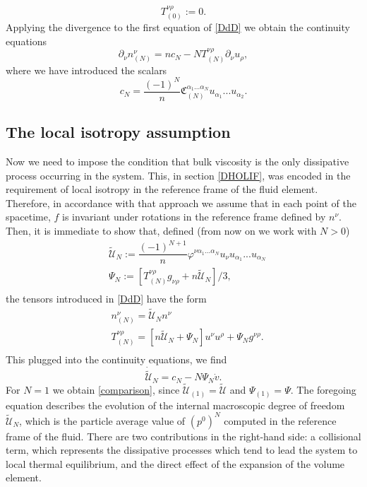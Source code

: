 \documentclass[useAMS,usenatbib,prd,twocolumn,nofootinbib]{revtex4-1}
\begin{document}
\begin{equation}
T_{(0)}^{\nu \rho}:=0.
\end{equation}
Applying the divergence to the first equation of \eqref{DdD} we obtain the continuity equations
\begin{equation}\label{Tonino!!!!!!!}
\partial_\nu n_{(N)}^\nu = n c_N - N T^{\nu \rho}_{(N)} \partial_\nu u_\rho,
\end{equation}
where we have introduced the scalars
\begin{equation}
c_N= \dfrac{(-1)^N}{n} \mathfrak{C}_{(N)}^{\alpha_1 ... \alpha_N} u_{\alpha_1}...u_{\alpha_2}.
\end{equation}

\subsection{The local isotropy assumption}

Now we need to impose the condition that bulk viscosity is the only dissipative process occurring in the system. This, in section \ref{DHOLIF}, was encoded in the requirement of local isotropy in the reference frame of the fluid element. Therefore, in accordance with that approach we assume that in each point of the spacetime, $f$ is invariant under rotations in the reference frame defined by $n^\nu$. Then, it is immediate to show that, defined (from now on we work with $N>0$)
\begin{equation}\label{baluba}
\begin{split}
& \tilde{\mathcal{U}}_N := \dfrac{(-1)^{N+1}}{n} \varphi^{\nu \alpha_1 ... \alpha_N} u_\nu u_{\alpha_1}...u_{\alpha_N} \\
& \Psi_N := [T_{(N)}^{\nu \rho} g_{\nu \rho}+n \tilde{\mathcal{U}}_N]/3 , \\
\end{split}
\end{equation}
the tensors introduced in \eqref{DdD} have the form
\begin{equation}
\begin{split}
& n_{(N)}^\nu = \tilde{\mathcal{U}}_N n^\nu \\ 
& T^{\nu \rho}_{(N)} = [n\tilde{\mathcal{U}}_N + \Psi_N]u^\nu u^\rho + \Psi_N g^{\nu \rho}. \\
\end{split}
\end{equation}
This plugged into the continuity equations, we find
\begin{equation}\label{terRrmino!}
\dot{\tilde{\mathcal{U}}}_{N} = c_N -N \Psi_N \dot{v}.
\end{equation}
For $N=1$ we obtain \eqref{comparison}, since $\tilde{\mathcal{U}}_{(1)} = \tilde{\mathcal{U}}$ and $\Psi_{(1)} = \Psi$. The foregoing equation describes the evolution of the internal macroscopic degree of freedom $\tilde{\mathcal{U}}_N$, which is the particle average value of $(p^0)^N$ computed in the reference frame of the fluid. There are two contributions in the right-hand side: a collisional term, which represents the dissipative processes which tend to lead the system to local thermal equilibrium, and the direct effect of the expansion of the volume element.
\end{document}

